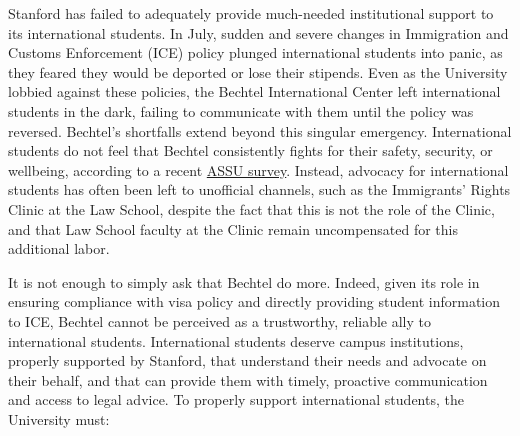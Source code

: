 \documentclass[12pt, titlepage, letterpaper]{article}
\begin{document}
Stanford has failed to adequately provide much-needed institutional support to its international students. In July, sudden and severe changes in Immigration and Customs Enforcement (ICE) policy plunged international students into panic, as they feared they would be deported or lose their stipends. Even as the University lobbied against these policies, the Bechtel International Center left international students in the dark, failing to communicate with them until the policy was reversed. Bechtel’s shortfalls extend beyond this singular emergency. International students do not feel that Bechtel consistently fights for their safety, security, or wellbeing, according to a recent \href{https://docs.google.com/forms/d/e/1FAIpQLSeRj57M0mXMKo2pvqEIhHN7VghqA_E0PUXkyu7Jvpn7wyOLuA/viewform?pli=1}{ASSU survey}. Instead, advocacy for international students has often been left to unofficial channels, such as the Immigrants’ Rights Clinic at the Law School, despite the fact that this is not the role of the Clinic, and that Law School faculty at the Clinic remain uncompensated for this additional labor.   

It is not enough to simply ask that Bechtel do more. Indeed, given its role in ensuring compliance with visa policy and directly providing student information to ICE, Bechtel cannot be perceived as a trustworthy, reliable ally to international students. International students deserve campus institutions, properly supported by Stanford, that understand their needs and advocate on their behalf, and that can provide them with timely, proactive communication and access to legal advice. To properly support international students, the University must:
\end{document}
